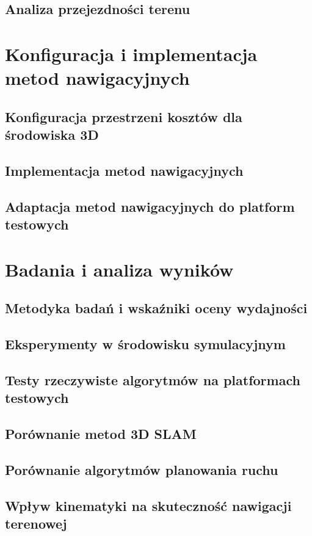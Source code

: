 \documentclass[a4paper,twoside,12pt]{book}
\begin{document}
\section{Analiza przejezdności terenu}

\chapter{Konfiguracja i implementacja metod nawigacyjnych}
\section{Konfiguracja przestrzeni kosztów dla środowiska 3D}
\section{Implementacja metod nawigacyjnych}
\section{Adaptacja metod nawigacyjnych do platform testowych}

\chapter{Badania i analiza wyników}
\section{Metodyka badań i wskaźniki oceny wydajności}
\section{Eksperymenty w środowisku symulacyjnym}
\section{Testy rzeczywiste algorytmów na platformach testowych}
\section{Porównanie metod 3D SLAM}
\section{Porównanie algorytmów planowania ruchu}
\section{Wpływ kinematyki na skuteczność nawigacji terenowej}
\end{document}

